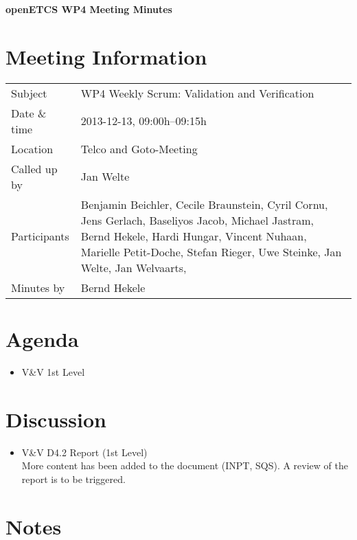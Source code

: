 \documentclass[a4paper, 11pt]{article}
\begin{document}
{\begin{center}\huge\bf openETCS WP4 Meeting Minutes\end{center}}
\section{Meeting Information}

\renewcommand{\arraystretch}{1.5}
\begin{supertabular}{m{.2\textwidth}m{.8\textwidth}}
Subject & WP4 Weekly Scrum: Validation and Verification\\
Date \& time & 2013-12-13, 09:00h--09:15h\\
Location & Telco and Goto-Meeting\\
Called up by & Jan Welte\\
Participants &
Benjamin Beichler,
Cecile Braunstein,
Cyril Cornu,
Jens Gerlach,
Baseliyos Jacob,
Michael Jastram,
Bernd Hekele,
Hardi Hungar,
Vincent Nuhaan,
Marielle Petit-Doche,
Stefan Rieger,
Uwe Steinke,
Jan Welte,
Jan Welvaarts,
\\

Minutes by & Bernd Hekele\\

\end{supertabular}
\renewcommand{\arraystretch}{1.0}


\section{{Agenda}}
\begin{itemize}
\item V\&V 1st Level 
\end{itemize}

\section{Discussion}

\begin{itemize}
\item V\&V D4.2 Report (1st Level)\\
More content has been added to the document (INPT, SQS). A review of the report is to be triggered. 

\end{itemize}


\section{Notes}
\end{document}
